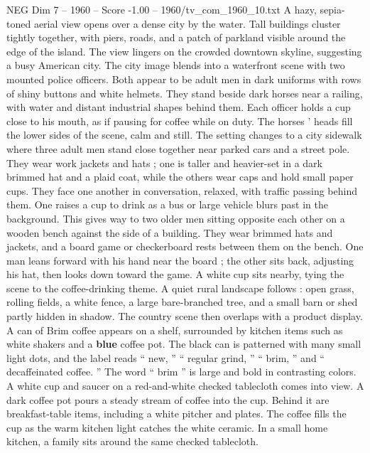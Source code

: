 \begin{textsample}{NEG Dim 7 – 1960 – Score -1.00 – 1960/tv\_com\_1960\_10.txt}  \label{ex:f7_neg_073}
A hazy, sepia-toned aerial view opens over a dense city by the water.
Tall buildings cluster tightly together, with piers, roads, and a patch of parkland visible around the edge of the island.
The view lingers on the crowded downtown skyline, suggesting a busy American city.
The city image blends into a waterfront scene with two mounted police officers.
Both appear to be adult men in dark uniforms with rows of shiny buttons and white helmets.
They stand beside dark horses near a railing, with water and distant industrial shapes behind them.
Each officer holds a cup close to his mouth, as if pausing for coffee while on duty.
The horses ’ heads fill the lower sides of the scene, calm and still.
The setting changes to a city sidewalk where three adult men stand close together near parked cars and a street pole.
They wear work jackets and hats ; one is taller and heavier-set in a dark brimmed hat and a plaid coat, while the others wear caps and hold small paper cups.
They face one another in conversation, relaxed, with traffic passing behind them.
One raises a cup to drink as a bus or large vehicle blurs past in the background.
This gives way to two older men sitting opposite each other on a wooden bench against the side of a building.
They wear brimmed hats and jackets, and a board game or checkerboard rests between them on the bench.
One man leans forward with his hand near the board ; the other sits back, adjusting his hat, then looks down toward the game.
A white cup sits nearby, tying the scene to the coffee-drinking theme.
A quiet rural landscape follows : open grass, rolling fields, a white fence, a large bare-branched tree, and a small barn or shed partly hidden in shadow.
The country scene then overlaps with a product display.
A can of Brim coffee appears on a shelf, surrounded by kitchen items such as white shakers and a \textbf{blue} coffee pot.
The black can is patterned with many small light dots, and the label reads “ new, ” “ regular grind, ” “ brim, ” and “ decaffeinated coffee. ” The word “ brim ” is large and bold in contrasting colors.
A white cup and saucer on a red-and-white checked tablecloth comes into view.
A dark coffee pot pours a steady stream of coffee into the cup.
Behind it are breakfast-table items, including a white pitcher and plates.
The coffee fills the cup as the warm kitchen light catches the white ceramic.
In a small home kitchen, a family sits around the same checked tablecloth.

\end{textsample}
